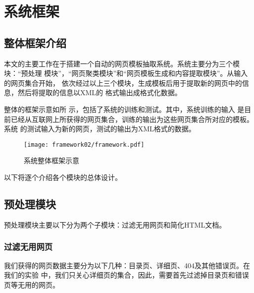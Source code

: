 
\chapter{系统框架}
\label{chap:framework}
\section{整体框架介绍}
\label{sec:wholeframework}
本文的主要工作在于搭建一个自动的网页模板抽取系统。系统主要分为三个模块：“预处理
模块”，“网页聚类模块”和“网页模板生成和内容提取模块”。从输入的网页集合开始，
依次经过以上三个模块，生成模板后用于提取新的网页中的信息，然后将提取的信息以XML的
格式输出成格式化数据。

整体的框架示意如所
示，包括了系统的训练和测试。其中，系统训练的输入
是目前已经从互联网上所获得的网页集合，训练的输出为这些网页集合所对应的模板。系统
的测试输入为新的网页，测试的输出为XML格式的数据。

\begin{figure}
  \centering
  \texttt{[image: framework02/framework.pdf]}
  \caption{系统整体框架示意}
  \label{framework:fig:framework}
\end{figure}

以下将逐个介绍各个模块的总体设计。
\section{预处理模块}
\label{sec:filterintro}
预处理模块主要以下分为两个子模块：过滤无用网页和简化HTML文档。
\subsection{过滤无用网页}
我们获得的网页数据主要分为以下几种：目录页、详细页、404及其他错误页。在我们的实验
中，我们只关心详细页的集合，因此，需要首先过滤掉目录页和错误页等无用的网页。

